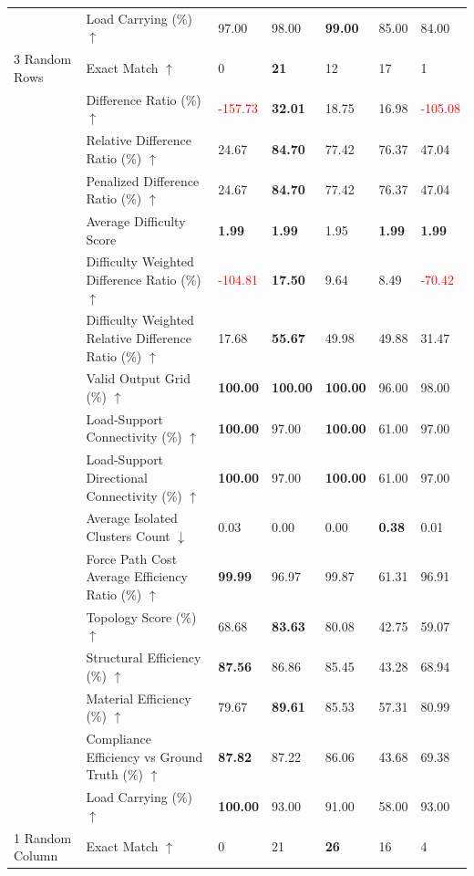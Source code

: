 \begin{table}[!h]
{\begin{tabular}{lllllll}
 & Load Carrying (\%) $\uparrow$ & 97.00 & 98.00 & \textbf{99.00} & 85.00 & 84.00 \\
3 Random Rows & Exact Match $\uparrow$ & 0 & \textbf{21} & 12 & 17 & 1 \\
 & Difference Ratio (\%) $\uparrow$ & \textcolor{red}{-157.73} & \textbf{32.01} & 18.75 & 16.98 & \textcolor{red}{-105.08} \\
 & Relative Difference Ratio (\%) $\uparrow$ & 24.67 & \textbf{84.70} & 77.42 & 76.37 & 47.04 \\
 & Penalized Difference Ratio (\%) $\uparrow$ & 24.67 & \textbf{84.70} & 77.42 & 76.37 & 47.04 \\
 & Average Difficulty Score & \textbf{1.99} & \textbf{1.99} & 1.95 & \textbf{1.99} & \textbf{1.99} \\
 & Difficulty Weighted Difference Ratio (\%) $\uparrow$ & \textcolor{red}{-104.81} & \textbf{17.50} & 9.64 & 8.49 & \textcolor{red}{-70.42} \\
 & Difficulty Weighted Relative Difference Ratio (\%) $\uparrow$ & 17.68 & \textbf{55.67} & 49.98 & 49.88 & 31.47 \\
 & Valid Output Grid (\%) $\uparrow$ & \textbf{100.00} & \textbf{100.00} & \textbf{100.00} & 96.00 & 98.00 \\
 & Load-Support Connectivity (\%) $\uparrow$ & \textbf{100.00} & 97.00 & \textbf{100.00} & 61.00 & 97.00 \\
 & Load-Support Directional Connectivity (\%) $\uparrow$ & \textbf{100.00} & 97.00 & \textbf{100.00} & 61.00 & 97.00 \\
 & Average Isolated Clusters Count $\downarrow$ & 0.03 & 0.00 & 0.00 & \textbf{0.38} & 0.01 \\
 & Force Path Cost Average Efficiency Ratio (\%) $\uparrow$ & \textbf{99.99} & 96.97 & 99.87 & 61.31 & 96.91 \\
 & Topology Score (\%) $\uparrow$ & 68.68 & \textbf{83.63} & 80.08 & 42.75 & 59.07 \\
 & Structural Efficiency (\%) $\uparrow$ & \textbf{87.56} & 86.86 & 85.45 & 43.28 & 68.94 \\
 & Material Efficiency (\%) $\uparrow$ & 79.67 & \textbf{89.61} & 85.53 & 57.31 & 80.99 \\
 & Compliance Efficiency vs Ground Truth (\%) $\uparrow$ & \textbf{87.82} & 87.22 & 86.06 & 43.68 & 69.38 \\
 & Load Carrying (\%) $\uparrow$ & \textbf{100.00} & 93.00 & 91.00 & 58.00 & 93.00 \\
1 Random Column & Exact Match $\uparrow$ & 0 & 21 & \textbf{26} & 16 & 4 \\

\end{tabular}}
\end{table}
